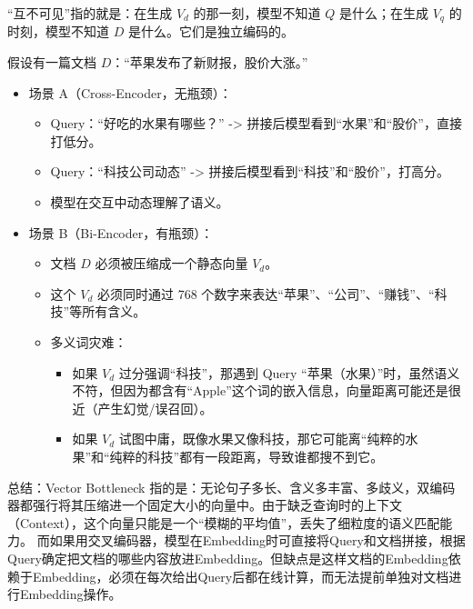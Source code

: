 ``互不可见''指的就是：在生成 \(V_d\) 的那一刻，模型不知道 \(Q\) 是什么；在生成 \(V_q\) 的时刻，模型不知道 \(D\) 是什么。它们是独立编码的。

假设有一篇文档 \(D\)：``苹果发布了新财报，股价大涨。''

\begin{itemize}
\tightlist
\item
  场景 A（Cross-Encoder，无瓶颈）：

  \begin{itemize}
  \tightlist
  \item
    Query：``好吃的水果有哪些？'' -\textgreater{} 拼接后模型看到``水果''和``股价''，直接打低分。
  \item
    Query：``科技公司动态'' -\textgreater{} 拼接后模型看到``科技''和``股价''，打高分。
  \item
    模型在交互中动态理解了语义。
  \end{itemize}
\item
  场景 B（Bi-Encoder，有瓶颈）：

  \begin{itemize}
  \tightlist
  \item
    文档 \(D\) 必须被压缩成一个静态向量 \(V_d\)。
  \item
    这个 \(V_d\) 必须同时通过 768 个数字来表达``苹果''、``公司''、``赚钱''、``科技''等所有含义。
  \item
    多义词灾难：

    \begin{itemize}
    \tightlist
    \item
      如果 \(V_d\) 过分强调``科技''，那遇到 Query ``苹果（水果）''时，虽然语义不符，但因为都含有``Apple''这个词的嵌入信息，向量距离可能还是很近（产生幻觉/误召回）。
    \item
      如果 \(V_d\) 试图中庸，既像水果又像科技，那它可能离``纯粹的水果''和``纯粹的科技''都有一段距离，导致谁都搜不到它。
    \end{itemize}
  \end{itemize}
\end{itemize}

总结：Vector Bottleneck 指的是：无论句子多长、含义多丰富、多歧义，双编码器都强行将其压缩进一个固定大小的向量中。由于缺乏查询时的上下文（Context），这个向量只能是一个``模糊的平均值''，丢失了细粒度的语义匹配能力。
而如果用交叉编码器，模型在Embedding时可直接将Query和文档拼接，根据Query确定把文档的哪些内容放进Embedding。但缺点是这样文档的Embedding依赖于Embedding，必须在每次给出Query后都在线计算，而无法提前单独对文档进行Embedding操作。


